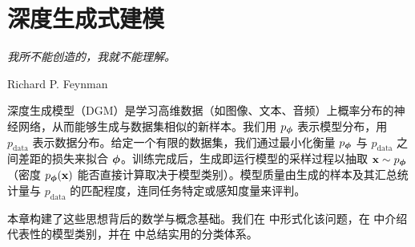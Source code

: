 \chapter{深度生成式建模}\label{ch:overview-dgm}

\epigraph{
    \textit{我所不能创造的，我就不能理解。}}{Richard P. Feynman}




深度生成模型（DGM）是学习高维数据（如图像、文本、音频）上概率分布的神经网络，从而能够生成与数据集相似的新样本。我们用 $p_{{\bm{\phi}}}$ 表示模型分布，用 $p_{\mathrm{data}}$ 表示数据分布。给定一个有限的数据集，我们通过最小化衡量 $p_{{\bm{\phi}}}$ 与 $p_{\mathrm{data}}$ 之间差距的损失来拟合 ${\bm{\phi}}$。训练完成后，生成即运行模型的采样过程以抽取 ${\mathbf{x}} \sim p_{{\bm{\phi}}}$（密度 $p_{{\bm{\phi}}}({\mathbf{x}})$ 能否直接计算取决于模型类别）。模型质量由生成的样本及其汇总统计量与 $p_{\mathrm{data}}$ 的匹配程度，连同任务特定或感知度量来评判。


本章构建了这些思想背后的数学与概念基础。我们在  中形式化该问题，在  中介绍代表性的模型类别，并在  中总结实用的分类体系。










